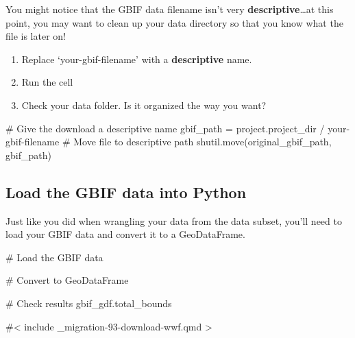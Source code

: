 \documentclass[
]{report}
\newenvironment{Shaded}{\begin{snugshade}}{\end{snugshade}}
\newcommand{\CommentTok}[1]{\textcolor[rgb]{0.37,0.37,0.37}{#1}}
\newcommand{\NormalTok}[1]{\textcolor[rgb]{0.00,0.23,0.31}{#1}}
\newcommand{\OperatorTok}[1]{\textcolor[rgb]{0.37,0.37,0.37}{#1}}
\newcommand{\StringTok}[1]{\textcolor[rgb]{0.13,0.47,0.30}{#1}}
\providecommand{\tightlist}{%
  \setlength{\itemsep}{0pt}\setlength{\parskip}{0pt}}
\begin{document}
You might notice that the GBIF data filename isn't very
\textbf{descriptive}\ldots at this point, you may want to clean up your
data directory so that you know what the file is later on!

\begin{tcolorbox}[enhanced jigsaw, breakable, colframe=quarto-callout-color-frame, toptitle=1mm, bottomrule=.15mm, colbacktitle=quarto-callout-color!10!white, opacityback=0, opacitybacktitle=0.6, coltitle=black, title=\textcolor{quarto-callout-color}{\faInfo}\hspace{0.5em}{Try It}, left=2mm, bottomtitle=1mm, titlerule=0mm, arc=.35mm, colback=white, rightrule=.15mm, toprule=.15mm, leftrule=.75mm]

\begin{enumerate}
\def\labelenumi{\arabic{enumi}.}
\tightlist
\item
  Replace `your-gbif-filename' with a \textbf{descriptive} name.
\item
  Run the cell
\item
  Check your data folder. Is it organized the way you want?
\end{enumerate}

\end{tcolorbox}

\begin{Shaded}
\begin{Highlighting}[]
\CommentTok{\# Give the download a descriptive name}
\NormalTok{gbif\_path }\OperatorTok{=}\NormalTok{ project.project\_dir }\OperatorTok{/} \StringTok{\textquotesingle{}your{-}gbif{-}filename\textquotesingle{}}
\CommentTok{\# Move file to descriptive path}
\NormalTok{shutil.move(original\_gbif\_path, gbif\_path)}
\end{Highlighting}
\end{Shaded}

\subsection{Load the GBIF data into
Python}\label{load-the-gbif-data-into-python}

\begin{tcolorbox}[enhanced jigsaw, breakable, colframe=quarto-callout-color-frame, toptitle=1mm, bottomrule=.15mm, colbacktitle=quarto-callout-color!10!white, opacityback=0, opacitybacktitle=0.6, coltitle=black, title=\textcolor{quarto-callout-color}{\faInfo}\hspace{0.5em}{Try It: Load GBIF data}, left=2mm, bottomtitle=1mm, titlerule=0mm, arc=.35mm, colback=white, rightrule=.15mm, toprule=.15mm, leftrule=.75mm]

Just like you did when wrangling your data from the data subset, you'll
need to load your GBIF data and convert it to a GeoDataFrame.

\end{tcolorbox}

\begin{Shaded}
\begin{Highlighting}[]
\CommentTok{\# Load the GBIF data}

\CommentTok{\# Convert to GeoDataFrame}

\CommentTok{\# Check results}
\NormalTok{gbif\_gdf.total\_bounds}
\end{Highlighting}
\end{Shaded}

\#{{< include _migration-93-download-wwf.qmd >}}
\end{document}

